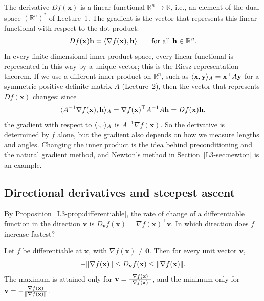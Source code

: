 \begin{remark}\label{L3-rem:riesz}
    The derivative $Df(\mathbf{x})$ is a linear functional $\mathbb{R}^n \to \mathbb{R}$, i.e., an element of the dual space $(\mathbb{R}^n)^*$ of Lecture~1. The gradient is the vector that represents this linear functional with respect to the dot product:
    \[Df(\mathbf{x})\mathbf{h} = \langle \nabla f(\mathbf{x}), \mathbf{h} \rangle \qquad \text{for all } \mathbf{h} \in \mathbb{R}^n.\]
    In every finite-dimensional inner product space, every linear functional is represented in this way by a unique vector; this is the Riesz representation theorem. If we use a different inner product on $\mathbb{R}^n$, such as $\langle \mathbf{x}, \mathbf{y} \rangle_A = \mathbf{x}^\top A \mathbf{y}$ for a symmetric positive definite matrix $A$ (Lecture~2), then the vector that represents $Df(\mathbf{x})$ changes: since
    \[\langle A^{-1} \nabla f(\mathbf{x}), \mathbf{h} \rangle_A = \nabla f(\mathbf{x})^\top A^{-1} A \mathbf{h} = Df(\mathbf{x})\mathbf{h},\]
    the gradient with respect to $\langle \cdot, \cdot \rangle_A$ is $A^{-1} \nabla f(\mathbf{x})$. So the derivative is determined by $f$ alone, but the gradient also depends on how we measure lengths and angles. Changing the inner product is the idea behind preconditioning and the natural gradient method, and Newton's method in Section~\ref{L3-sec:newton} is an example.
\end{remark}

\subsection{Directional derivatives and steepest ascent}

By Proposition~\ref{L3-prop:differentiable}, the rate of change of a differentiable function in the direction $\mathbf{v}$ is $D_{\mathbf{v}} f(\mathbf{x}) = \nabla f(\mathbf{x})^\top \mathbf{v}$. In which direction does $f$ increase fastest?

\begin{theorem}\label{L3-thm:steepest}
    Let $f$ be differentiable at $\mathbf{x}$, with $\nabla f(\mathbf{x}) \neq \mathbf{0}$. Then for every unit vector $\mathbf{v}$,
    \[-\lVert \nabla f(\mathbf{x}) \rVert \leq D_{\mathbf{v}} f(\mathbf{x}) \leq \lVert \nabla f(\mathbf{x}) \rVert.\]
    The maximum is attained only for $\mathbf{v} = \frac{\nabla f(\mathbf{x})}{\lVert \nabla f(\mathbf{x}) \rVert}$, and the minimum only for $\mathbf{v} = -\frac{\nabla f(\mathbf{x})}{\lVert \nabla f(\mathbf{x}) \rVert}$.
\end{theorem}

